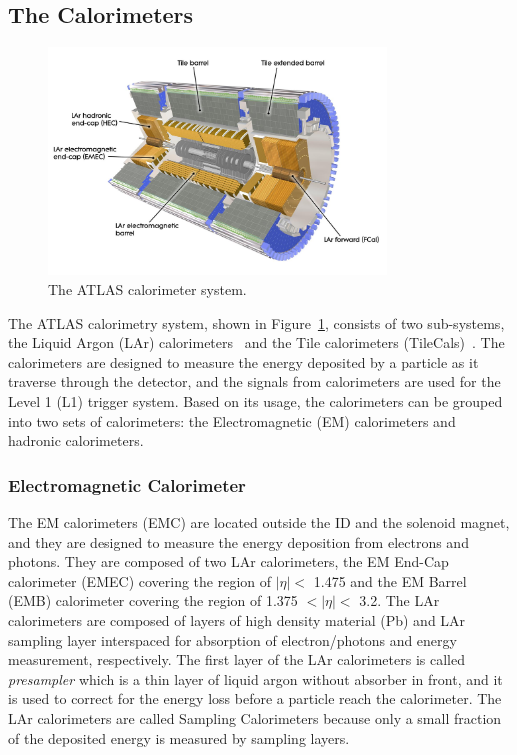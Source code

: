 \subsection{The Calorimeters}
\label{sec:atlas:calorimeter}

\begin{figure}[!htb]
    \includegraphics[width=0.8\textwidth]{figs/calorimeter.jpg}
    \centering
    \caption{The ATLAS calorimeter system.}
    \label{fig:calorimeter}
\end{figure}


The ATLAS calorimetry system, shown in Figure~\ref{fig:calorimeter}, consists of two sub-systems, the Liquid Argon (LAr) calorimeters~\cite{1742-6596-293-1-012044} and the Tile calorimeters (TileCals)~\cite{HenriquesCorreia:2004868}. The calorimeters are designed to measure the energy deposited by a particle as it traverse through the detector, and the signals from calorimeters are used for the Level 1 (L1) trigger system. Based on its usage, the calorimeters can be grouped into two sets of calorimeters: the Electromagnetic (EM) calorimeters and hadronic calorimeters.


\subsubsection{Electromagnetic Calorimeter}
\label{sec:atlas:EMcal}
The EM calorimeters (EMC) are located outside the ID and the solenoid magnet, and they are designed to measure the energy deposition from electrons and photons. They are composed of two LAr calorimeters, the EM End-Cap calorimeter (EMEC) covering the region of $|\eta|<$ 1.475 and the EM Barrel (EMB) calorimeter covering the region of 1.375 $<|\eta|<$ 3.2. The LAr calorimeters are composed of layers of high density material (Pb) and LAr sampling layer interspaced for absorption of electron/photons and energy measurement, respectively. The first layer of the LAr calorimeters is called \textit{presampler} which is a thin layer of liquid argon without absorber in front, and it is used to correct for the energy loss before a particle reach the calorimeter. The LAr calorimeters are called Sampling Calorimeters because only a small fraction of the deposited energy is measured by sampling layers.

